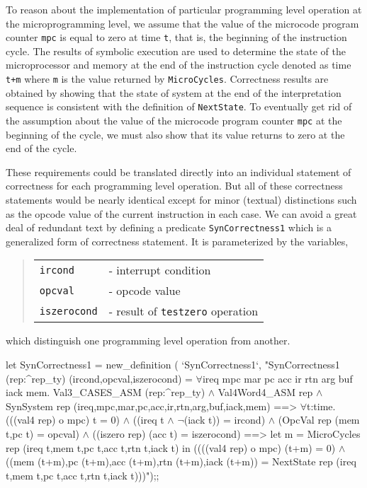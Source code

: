 To reason about the implementation of particular programming level
operation at the microprogramming level,
we assume that the value of the microcode program counter \verb"mpc" is
equal to zero at time \verb"t", that is, the beginning of the
instruction cycle.
The results of symbolic execution are used to determine the
state of the microprocessor and memory
at the end of the instruction cycle denoted as time \verb"t+m" where
\verb"m" is the value returned by \verb"MicroCycles".
Correctness results are obtained by showing that the state of
system at the end of the interpretation sequence
is consistent with the definition of \verb"NextState".
To eventually get rid of the assumption about the value of
the microcode program counter \verb"mpc" at the beginning of the cycle,
we must also show that its value returns to zero at the end of the cycle.

These requirements could be translated directly into
an individual statement of correctness for each programming level
operation.
But all of these correctness statements would be nearly identical
except for minor (textual)
distinctions such as the opcode value of the current
instruction in each case.
We can avoid a great deal of redundant text by defining a predicate
\verb"SynCorrectness1" which is a generalized form of
correctness statement.  It is parameterized by the variables,

\begin{quote}
\begin{tabular}{ll}
\verb"ircond"& - interrupt condition\\
\verb"opcval"& - opcode value\\
\verb"iszerocond"& - result of \verb"testzero" operation
\end{tabular}
\end{quote}

\noindent
which distinguish one programming level operation from another.

\begintt
let SynCorrectness1 = new_definition (
  `SynCorrectness1`,
  "SynCorrectness1 (rep:^rep_ty) (ircond,opcval,iszerocond) =
    \(\forall\)ireq mpc mar pc acc ir rtn arg buf iack mem.
      Val3_CASES_ASM (rep:^rep_ty) \(\wedge\)
      Val4Word4_ASM rep \(\wedge\)
      SynSystem rep (ireq,mpc,mar,pc,acc,ir,rtn,arg,buf,iack,mem)
      ==>
      \(\forall\)t:time.
        (((val4 rep) o mpc) t = 0) \(\wedge\)
        ((ireq t \(\wedge\) \(\neg\)(iack t)) = ircond) \(\wedge\)
        (OpcVal rep (mem t,pc t) = opcval) \(\wedge\)
        ((iszero rep) (acc t) = iszerocond)
        ==>
        let m = MicroCycles rep (ireq t,mem t,pc t,acc t,rtn t,iack t) in
        ((((val4 rep) o mpc) (t+m) = 0) \(\wedge\)
         ((mem (t+m),pc (t+m),acc (t+m),rtn (t+m),iack (t+m)) =
          NextState rep (ireq t,mem t,pc t,acc t,rtn t,iack t)))");;
\endtt

